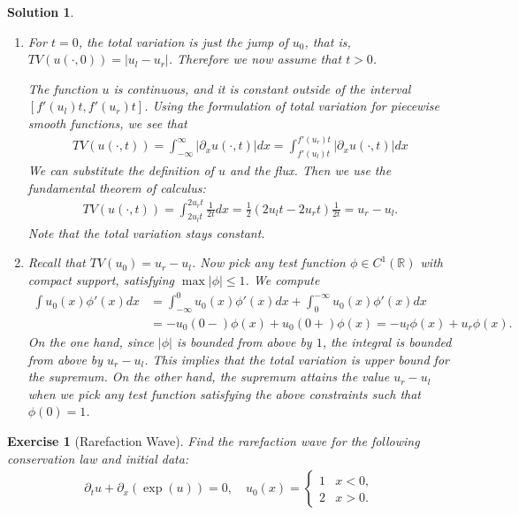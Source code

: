\documentclass[10pt,letterpaper]{article}
\theoremstyle{break}
\newtheorem{exercise}{Exercise}
\newtheorem{solution}{Solution}
\begin{document}
\begin{solution}
    \begin{enumerate}
     \item 
     For $t = 0$, the total variation is just the jump of $u_0$, that is, $TV(u(\cdot,0)) = |u_l - u_r|$.
     Therefore we now assume that $t > 0$.
     
     The function $u$ is continuous, and it is constant outside of the interval $[ f'(u_l)t, f'(u_r)t ]$.
     Using the formulation of total variation for piecewise smooth functions, we see that 
     \begin{align}
      TV(u(\cdot,t))
      =
      \int_{-\infty}^{\infty} | \partial_x u(\cdot,t) | dx
      =
      \int_{f'(u_l)t}^{f'(u_r)t} | \partial_x u(\cdot,t) | dx
     \end{align}
     We can substitute the definition of $u$ and the flux. Then we use the fundamental theorem of calculus:
     \begin{align}
      TV(u(\cdot,t))
      =
      \int_{2 u_l t}^{2 u_r t} \frac 1 {2t} dx
      =
      \frac 1 2 ( 2 u_l t - 2 u_r t ) \frac 1 {2t}
      =
      u_r - u_l.
     \end{align}
     Note that the total variation stays constant. 
    
     
     \item Recall that $TV(u_{0}) = u_r - u_l$. Now pick any test function $\phi \in C^{1}(\mathbb R)$ with compact support, satisfying $\max |\phi| \leq 1$.
     We compute 
     \begin{align}
      \int u_0(x) \phi'(x) dx
      &
      =
      \int_{-\infty}^{0} u_0(x) \phi'(x) dx
      +
      \int_{0}^{-\infty} u_0(x) \phi'(x) dx
      \\&
      =
      -
      u_0(0-) \phi(x)
      +
      u_0(0+) \phi(x)
      =
      -
      u_l \phi(x)
      +
      u_r \phi(x)
      .
     \end{align}
     On the one hand, since $|\phi|$ is bounded from above by $1$, the integral is bounded from above by $u_r - u_l$.
     This implies that the total variation is upper bound for the supremum.
     On the other hand, the supremum attains the value $u_r - u_l$ when we pick any test function satisfying the above constraints 
     such that $\phi(0) = 1$. 
    \end{enumerate}
\end{solution}





\begin{exercise}[Rarefaction Wave]
    Find the rarefaction wave for the following conservation law and initial data:
    \begin{align}
     \partial_t u + \partial_x \left( \exp(u) \right) = 0,
     \quad 
     u_{0}(x)
     = 
     \left\{
     \begin{array}{cc}
        1 & x < 0,
        \\
        2 & x > 0.
     \end{array}
     \right.
    \end{align}
\end{exercise}
\end{document}
